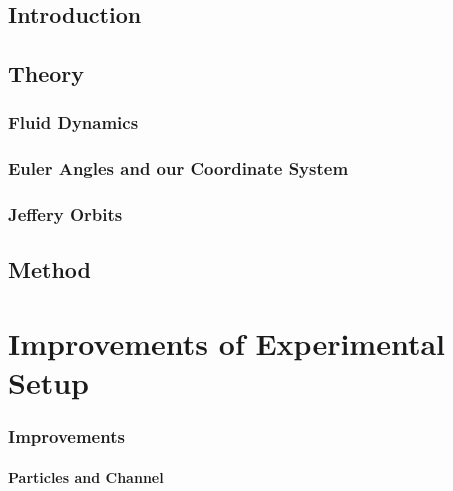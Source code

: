 \documentclass[]{report}
\begin{document}


\doublespacing



\setcounter{page}{1}
\pagestyle{fancy}
\setspecialhdr
\tableofcontents


\newpage
\setdefaulthdr
{}	
\setcounter{page}{1}

\chapter{Introduction}



\chapter{Theory}


\section{Fluid Dynamics}


\section{Euler Angles and our Coordinate System}


\section{Jeffery Orbits}


\chapter{Method}
\part{Improvements of Experimental Setup}

\section{Improvements}

\subsection{Particles and Channel}

\end{document}
